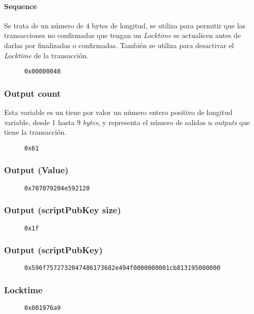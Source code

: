 \documentclass{article}
\begin{document}
    \paragraph{Sequence}
    Se trata de un número de 4 bytes de longitud, se utiliza para permitir que las transacciones no confirmadas que tengan un \textit{Locktime} se actualicen antes de darlas por finalizadas o confirmadas. También se utiliza para desactivar el \textit{Locktime} de la transacción.
    \begin{figure}[H]
        \texttt{0x00000048}
    \end{figure}
    
    \subsubsection{Output count}
    Esta variable es un tiene por valor un número entero positivo de longitud variable, desde 1 hasta 9 \textit{bytes}, y representa el número de salidas u \textit{outputs} que tiene la transacción.
    \begin{figure}[H]
        \texttt{0x61}
    \end{figure}
    
    \subsubsection{Output (Value)}
    \begin{figure}[H]
        \texttt{0x707079204e592120}
    \end{figure}
    
    \subsubsection{Output (scriptPubKey size)}
    \begin{figure}[H]
        \texttt{0x1f}
    \end{figure}
    
    \subsubsection{Output (scriptPubKey)}
    \begin{figure}[H]
        \texttt{0x596f7572732047486173682e494f0000000001cb813195000000}
    \end{figure}
    
    \subsubsection{Locktime}
    \begin{figure}[H]
        \texttt{0x001976a9}
    \end{figure}
    
\end{document}
